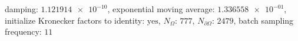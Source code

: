 damping: $\num[scientific-notation=true]{1.121914e-10}$, exponential moving average: $\num[scientific-notation=true]{1.336558e-01}$, initialize Kronecker factors to identity: $\text{yes}$, $N_{\Omega}$: $\num[scientific-notation=false]{777}$, $N_{\partial\Omega}$: $\num[scientific-notation=false]{2479}$, batch sampling frequency: $\num[scientific-notation=false]{11}$